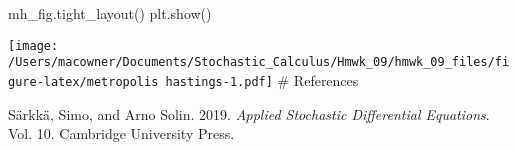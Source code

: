 \documentclass[]{article}
\newenvironment{Shaded}{\begin{snugshade}}{\end{snugshade}}
\newcommand{\NormalTok}[1]{#1}
\begin{document}
\begin{Shaded}
\begin{Highlighting}[]
\NormalTok{mh_fig.tight_layout()}
\NormalTok{plt.show()}
\end{Highlighting}
\end{Shaded}

\texttt{[image: /Users/macowner/Documents/Stochastic\_Calculus/Hmwk\_09/hmwk\_09\_files/figure-latex/metropolis hastings-1.pdf]}
\# References

\hypertarget{refs}{}
\leavevmode\hypertarget{ref-sarkka2019applied}{}%
Särkkä, Simo, and Arno Solin. 2019. \emph{Applied Stochastic
Differential Equations}. Vol. 10. Cambridge University Press.
\end{document}
